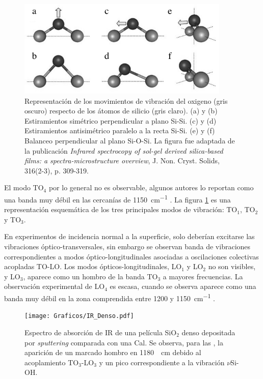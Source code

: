 		 		 \begin{figure}[!ht]
						\begin{center}
						\includegraphics[width=0.90\textwidth]{Imagenes/modos-infra.jpg}
						\caption[Modos de vibración Si-O-Si]{Representación de los movimientos de vibración del oxigeno (gris oscuro) respecto de los átomos de silicio (gris claro). (a) y (b) Estiramientos simétrico perpendicular a plano Si-Si. (c) y (d) Estiramientos antisimétrico paralelo a la recta Si-Si. (e) y (f) Balanceo perpendicular al plano Si-O-Si. La figura fue adaptada de la publicación \textit{Infrared spectrocopy of sol-gel derived silica-based films: a spectra-microstructure overview}, J. Non. Cryst. Solids, 316(2-3), p. 309-319.}
						\label{fig:modos-ir}
						\end{center}
						\end{figure}

		 El modo TO$_4$ por lo general no es observable, algunos autores lo reportan como una banda muy débil en las cercanías de \SI{1150}{\cm^{-1}} \cite{Pai1986,Grosse1986}. La figura \ref{fig:modos-ir} es una representación esquemática de los tres principales modos de vibración: TO$_1$, TO$_2$ y TO$_3$.

		 En experimentos de incidencia normal a la superficie, solo deberían excitarse las vibraciones óptico-transversales, sin embargo se observan banda de vibraciones correspondientes a modos óptico-longitudinales asociadas a oscilaciones colectivas acopladas TO-LO\cite{Pai1986,Grosse1986,Innocenzi2003}. Los modos ópticos-longitudinales, LO$_1$ y LO$_2$ no son visibles, y LO$_3$, aparece como un hombro de la banda TO$_3$ a mayores frecuencias. La observación experimental de LO$_4$ es escasa, cuando se observa aparece como una banda muy débil en la zona comprendida entre 1200 y \SI{1150}{\cm^{-1}} \cite{Pai1986,Grosse1986}.
		 
		  \begin{figure}[!th]
						\begin{center}
						\texttt{[image: Graficos/IR\_Denso.pdf]}
						\caption[FTIR SiO$_2$ denso y SiO$_2$ mesoporoso.]{Espectro de absorción de IR de una película SiO$_2$ denso depositada por \textit{sputtering }comparada con una Cal\pdmF. Se observa, para las \pdm, la aparición de un marcado hombro en \SI{1180}{\per\cm} debido al acoplamiento TO$_3$-LO$_3$ y un pico correspondiente a la vibración $\nu$Si-OH.}
						\label{fig:IR-denso}
						\end{center}
						\end{figure}

